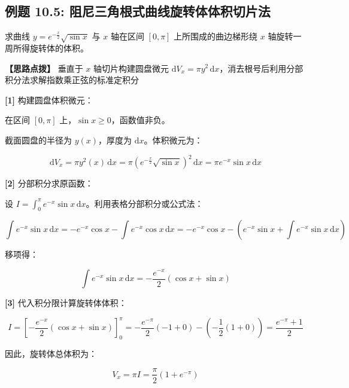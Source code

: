 \documentclass[11pt,a4paper,UTF8]{ctexart}
\begin{document}
\subsection{例题 10.5: 阻尼三角根式曲线旋转体体积切片法}

求曲线 $y = e^{-\frac{x}{2}}\sqrt{\sin x}$ 与 $x$ 轴在区间 $[0, \pi]$ 上所围成的曲边梯形绕 $x$ 轴旋转一周所得旋转体的体积。

\textbf{\color{DeepPurple}【思路点拨】} 垂直于 $x$ 轴切片构建圆盘微元 $\mathrm{d}V_x = \pi y^2\,\mathrm{d}x$，消去根号后利用分部积分法求解指数乘正弦的标准定积分


\begin{solbox}[分步推导与答题规范]
\textbf{[1]} 构建圆盘体积微元：

在区间 $[0, \pi]$ 上，$\sin x \geqslant 0$，函数值非负。

截面圆盘的半径为 $y(x)$，厚度为 $\mathrm{d}x$。体积微元为：


\begin{equation*}
\mathrm{d}V_x = \pi y^2(x)\,\mathrm{d}x = \pi \left(e^{-\frac{x}{2}}\sqrt{\sin x}\right)^2\,\mathrm{d}x = \pi e^{-x}\sin x\,\mathrm{d}x
\end{equation*}


\textbf{[2]} 分部积分求原函数：

设 $I = \int_0^\pi e^{-x}\sin x\,\mathrm{d}x$。利用表格分部积分或公式法：


\begin{equation*}
\int e^{-x}\sin x\,\mathrm{d}x = -e^{-x}\cos x - \int e^{-x}\cos x\,\mathrm{d}x = -e^{-x}\cos x - \left(e^{-x}\sin x + \int e^{-x}\sin x\,\mathrm{d}x\right)
\end{equation*}


移项得：


\begin{equation*}
\int e^{-x}\sin x\,\mathrm{d}x = -\frac{e^{-x}}{2}(\cos x + \sin x)
\end{equation*}


\textbf{[3]} 代入积分限计算旋转体体积：


\begin{equation*}
I = \left[-\frac{e^{-x}}{2}(\cos x + \sin x)\right]_0^\pi = -\frac{e^{-\pi}}{2}(-1+0) - \left(-\frac{1}{2}(1+0)\right) = \frac{e^{-\pi} + 1}{2}
\end{equation*}


因此，旋转体总体积为：


\begin{equation*}
V_x = \pi I = \frac{\pi}{2}(1 + e^{-\pi})
\end{equation*}

\end{solbox}
\end{document}
